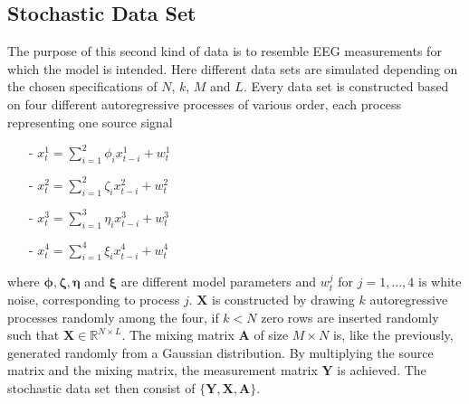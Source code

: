 \subsection{Stochastic Data Set}
The purpose of this second kind of data is to resemble EEG measurements for which the model is intended. 
Here different data sets are simulated depending on the chosen specifications of $N$, $k$, $M$ and $L$. 
Every data set is constructed based on four different autoregressive processes of various order, each process representing one source signal
\begin{itemize}
\item[-] $x_{t}^{1} = \sum_{i=1}^{2} \phi_i x_{t-i}^{1} + w_t^{1}$
\item[-] $x_{t}^{2} = \sum_{i=1}^{2} \zeta_i x_{t-i}^{2} + w_t^{2}$
\item[-] $x_{t}^{3} = \sum_{i=1}^{3} \eta_i x_{t-i}^{3} + w_t^{3}$
\item[-] $x_{t}^{4} = \sum_{i=1}^{4} \xi_i x_{t-i}^{4} + w_t^{4}$
\end{itemize}
where $\boldsymbol{\phi}, \boldsymbol{\zeta}, \boldsymbol{\eta}$ and $\boldsymbol{\xi}$ are different model parameters and $w_t^{j}$ for $j = 1,\hdots ,4$ is white noise, corresponding to process $j$.
$\mathbf{X}$ is constructed by drawing $k$ autoregressive processes randomly among the four, if $k < N$ zero rows are inserted randomly such that $\mathbf{X} \in \mathbb{R}^{N \times L}$.  
The mixing matrix $\mathbf{A}$ of size $M \times N$ is, like the previously, generated randomly from a Gaussian distribution.
By multiplying the source matrix and the mixing matrix, the measurement matrix $\mathbf{Y}$ is achieved.
The stochastic data set then consist of $\{ \mathbf{Y}, \mathbf{X}, \mathbf{A} \}$. 

